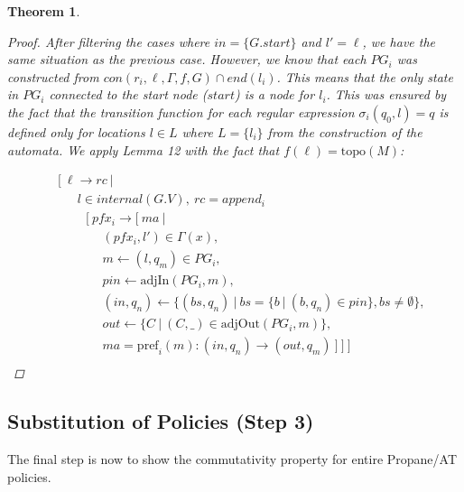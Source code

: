 \documentclass[twocolumn, openany]{sig-alternate-10pt}
\newcommand{\sysname}{{\small \sf Propane/AT}\xspace}
\newcommand{\Pref}{\ensuremath{\mathrm{pref}}}
\newcommand{\Topo}{\ensuremath{\mathrm{topo}}}
\newtheorem{thm}{Theorem}
\begin{document}
\begin{thm}
\begin{proof}
  After filtering the cases where $in = \{ G.start \}$ and $l' = \ell$, we have the same situation as the previous case. 
  However, we know that each $PG_{i}$ was constructed from $con(r_{i}, \ell, \Gamma, f, G) \cap end(l_{i})$. This means that the only state in $PG_{i}$ connected to the start node ($\mathit{start}$) is a node for $l_{i}$. This was ensured by the fact that the transition function for each regular expression $\sigma_{i}(q_0,l) = q$ is defined only for locations $l \in L$ where $L = \{ l_{i} \}$ from the construction of the automata. We apply Lemma 12 with the fact that $f(\ell) = \Topo(M)$:

    \[ \begin{array}{l}
     ~~~~~ [~ \ell \rightarrow rc ~\vert~ \\
     ~~~~~~~~~~~~ l \in internal(G.V), ~rc = append_i \\
     ~~~~~~~~~~~~~~~ [~ pfx_i \rightarrow [~ ma ~\vert~ \\
     ~~~~~~~~~~~~~~~~~~~~~ (pfx_i, l') \in \Gamma(x), \\
     ~~~~~~~~~~~~~~~~~~~~~ m \leftarrow (l,q_m) \in PG_i, \\
     ~~~~~~~~~~~~~~~~~~~~~ pin \leftarrow \text{adjIn}(PG_i,m), \\
     ~~~~~~~~~~~~~~~~~~~~~ (in,q_n) \leftarrow \{ (bs,q_n) ~\vert~ bs=\{b ~\vert~ (b,q_n) \in pin \}, bs \neq \emptyset \}, \\
     ~~~~~~~~~~~~~~~~~~~~~ out \leftarrow \{ C ~\vert~ (C,\_) \in \text{adjOut}(PG_i,m) \}, \\
     ~~~~~~~~~~~~~~~~~~~~~ ma = \Pref_i(m) : (in,q_n) \rightarrow (out,q_m)  ~] ~] ~]\\
  \end{array} \]%



  \end{proof}

\end{thm}


\vspace{2em}
\subsection{Substitution of Policies (Step 3)}

The final step is now to show the commutativity property for entire \sysname policies.
\end{document}
